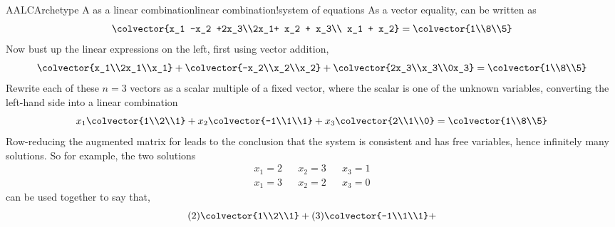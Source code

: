 \begin{example}{AALC}{Archetype A as a linear combination}{linear combination!system of equations}
As a vector equality,  can be written as
%
\begin{equation*}
\colvector{x_1 -x_2 +2x_3\\2x_1+ x_2 + x_3\\ x_1 + x_2}
=
\colvector{1\\8\\5}
\end{equation*}
%
Now  bust up the linear expressions on the left, first using vector addition,
%
\begin{equation*}
\colvector{x_1\\2x_1\\x_1}+
\colvector{-x_2\\x_2\\x_2}+
\colvector{2x_3\\x_3\\0x_3}
=
\colvector{1\\8\\5}
\end{equation*}
%
Rewrite each of these $n=3$ vectors as a scalar multiple of a fixed vector, where the scalar is one of the unknown variables, converting the left-hand side into a linear combination
%
\begin{equation*}
x_1\colvector{1\\2\\1}+
x_2\colvector{-1\\1\\1}+
x_3\colvector{2\\1\\0}
=
\colvector{1\\8\\5}
\end{equation*}
%
Row-reducing the augmented matrix for  leads to the conclusion that the system is consistent and has free variables, hence infinitely many solutions.  So for example, the two solutions
%
\begin{align*}
x_1 = 2&&x_2 = 3&&x_3 = 1\\
x_1 = 3&&x_2 = 2&&x_3 = 0
\end{align*}
%
can be used together to say that,
%
\begin{equation*}
(2)\colvector{1\\2\\1}+
(3)\colvector{-1\\1\\1}+

\end{equation*}
\end{example}

